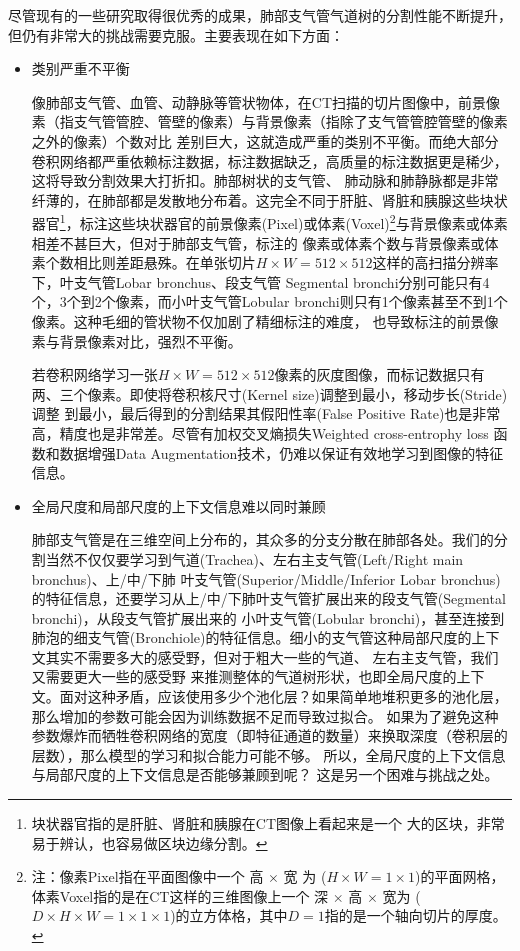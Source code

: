 尽管现有的一些研究取得很优秀的成果，肺部支气管气道树的分割性能不断提升，但仍有非常大的挑战需要克服。主要表现在如下方面：
\begin{itemize}
	\item {\heiti 类别严重不平衡}
	
	像肺部支气管、血管、动静脉等管状物体，在CT扫描的切片图像中，前景像素（指支气管管腔、管壁的像素）与背景像素（指除了支气管管腔管壁的像素之外的像素）个数对比
	差别巨大，这就造成严重的类别不平衡。而绝大部分卷积网络都严重依赖标注数据，标注数据缺乏，高质量的标注数据更是稀少，这将导致分割效果大打折扣。肺部树状的支气管、
	肺动脉和肺静脉都是非常纤薄的，在肺部都是发散地分布着。这完全不同于肝脏、肾脏和胰腺这些块状器官\footnote{块状器官指的是肝脏、肾脏和胰腺在CT图像上看起来是一个
	大的区块，非常易于辨认，也容易做区块边缘分割。}，标注这些块状器官的前景像素(Pixel)或体素(Voxel)\footnote{注：像素Pixel指在平面图像中一个 高 $\times$ 宽 为
	($H \times W = 1 \times 1$)的平面网格，体素Voxel指的是在CT这样的三维图像上一个 深 $\times$ 高 $\times$ 宽为
	($D \times H \times W = 1 \times 1 \times 1$)的立方体格，其中$D = 1$指的是一个轴向切片的厚度。}与背景像素或体素相差不甚巨大，但对于肺部支气管，标注的
	像素或体素个数与背景像素或体素个数相比则差距悬殊。在单张切片$H \times W = 512 \times 512$这样的高扫描分辨率下，叶支气管Lobar bronchus、段支气管
	Segmental bronchi分别可能只有4个，3个到2个像素，而小叶支气管Lobular bronchi则只有1个像素甚至不到1个像素。这种毛细的管状物不仅加剧了精细标注的难度，
	也导致标注的前景像素与背景像素对比，强烈不平衡。
	
	若卷积网络学习一张$H \times W = 512 \times 512$像素的灰度图像，而标记数据只有两、三个像素。即使将卷积核尺寸(Kernel size)调整到最小，移动步长(Stride)调整
	到最小，最后得到的分割结果其假阳性率(False Positive Rate)也是非常高，精度也是非常差。尽管有加权交叉熵损失Weighted cross-entrophy loss
	\cite{Yuri2019WeightedCrossEntrophy}函数和数据增强Data Augmentation技术，仍难以保证有效地学习到图像的特征信息。
	
	\item {\heiti 全局尺度和局部尺度的上下文信息难以同时兼顾}
	
	肺部支气管是在三维空间上分布的，其众多的分支分散在肺部各处。我们的分割当然不仅仅要学习到气道(Trachea)、左右主支气管(Left/Right main bronchus)、上/中/下肺
	叶支气管(Superior/Middle/Inferior Lobar bronchus)的特征信息，还要学习从上/中/下肺叶支气管扩展出来的段支气管(Segmental bronchi)，从段支气管扩展出来的
	小叶支气管(Lobular bronchi)，甚至连接到肺泡的细支气管(Bronchiole)的特征信息。细小的支气管这种局部尺度的上下文其实不需要多大的感受野，但对于粗大一些的气道、
	左右主支气管，我们又需要更大一些的感受野
	来推测整体的气道树形状，也即全局尺度的上下文。面对这种矛盾，应该使用多少个池化层？如果简单地堆积更多的池化层，那么增加的参数可能会因为训练数据不足而导致过拟合。
	如果为了避免这种参数爆炸而牺牲卷积网络的宽度（即特征通道的数量）来换取深度（卷积层的层数），那么模型的学习和拟合能力可能不够\cite{Qin2021TubuleSen}。
	所以，全局尺度的上下文信息与局部尺度的上下文信息是否能够兼顾到呢？ 这是另一个困难与挑战之处。
\end{itemize}


